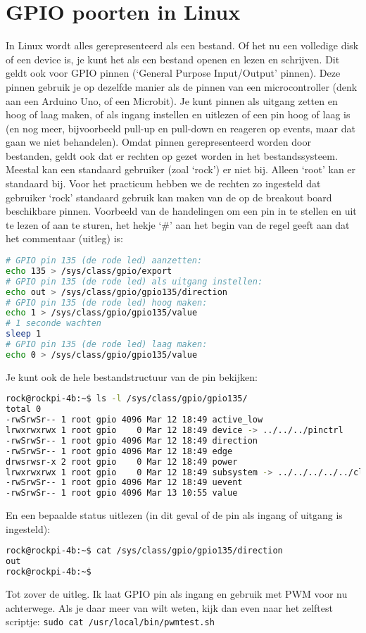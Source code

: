 \section{GPIO poorten in Linux}\label{app:gpiolinux}
In Linux wordt alles gerepresenteerd als een bestand. Of het nu een volledige disk of een device is, je kunt het als een bestand openen en lezen en schrijven. Dit geldt ook voor GPIO pinnen (‘General Purpose Input/Output’ pinnen). Deze pinnen gebruik je op dezelfde manier als de pinnen van een microcontroller (denk aan een Arduino Uno, of een Microbit). Je kunt pinnen als uitgang zetten en hoog of laag maken, of als ingang instellen en uitlezen of een pin hoog of laag is (en nog meer, bijvoorbeeld pull-up en pull-down en reageren op events, maar dat gaan we niet behandelen).\newline
Omdat pinnen gerepresenteerd worden door bestanden, geldt ook dat er rechten op gezet worden in het bestandssysteem. Meestal kan een standaard gebruiker (zoal ‘rock’) er niet bij. Alleen ‘root’ kan er standaard bij. Voor het practicum hebben we de rechten zo ingesteld dat gebruiker ‘rock’ standaard gebruik kan maken van de op de breakout board beschikbare pinnen.\newline
Voorbeeld van de handelingen om een pin in te stellen en uit te lezen of aan te sturen, het hekje ‘\#’ aan het begin van de regel geeft aan dat het commentaar (uitleg) is:

\begin{lstlisting}[language=bash]
# GPIO pin 135 (de rode led) aanzetten:
echo 135 > /sys/class/gpio/export
# GPIO pin 135 (de rode led) als uitgang instellen:
echo out > /sys/class/gpio/gpio135/direction
# GPIO pin 135 (de rode led) hoog maken:
echo 1 > /sys/class/gpio/gpio135/value
# 1 seconde wachten
sleep 1
# GPIO pin 135 (de rode led) laag maken:
echo 0 > /sys/class/gpio/gpio135/value
\end{lstlisting}
	
Je kunt ook de hele bestandstructuur van de pin bekijken:
\begin{lstlisting}[language=bash]
rock@rockpi-4b:~$ ls -l /sys/class/gpio/gpio135/
total 0
-rwSrwSr-- 1 root gpio 4096 Mar 12 18:49 active_low
lrwxrwxrwx 1 root gpio    0 Mar 12 18:49 device -> ../../../pinctrl
-rwSrwSr-- 1 root gpio 4096 Mar 12 18:49 direction
-rwSrwSr-- 1 root gpio 4096 Mar 12 18:49 edge
drwsrwsr-x 2 root gpio    0 Mar 12 18:49 power
lrwxrwxrwx 1 root gpio    0 Mar 12 18:49 subsystem -> ../../../../../class/gpio
-rwSrwSr-- 1 root gpio 4096 Mar 12 18:49 uevent
-rwSrwSr-- 1 root gpio 4096 Mar 13 10:55 value
\end{lstlisting}
	
En een bepaalde status uitlezen (in dit geval of de pin als ingang of uitgang is ingesteld):
\begin{lstlisting}[language=bash]
rock@rockpi-4b:~$ cat /sys/class/gpio/gpio135/direction
out
rock@rockpi-4b:~$
\end{lstlisting}
	
Tot zover de uitleg. Ik laat GPIO pin als ingang en gebruik met PWM voor nu achterwege. Als je daar meer van wilt weten, kijk dan even naar het zelftest scriptje: \texttt{sudo cat /usr/local/bin/pwmtest.sh} 

